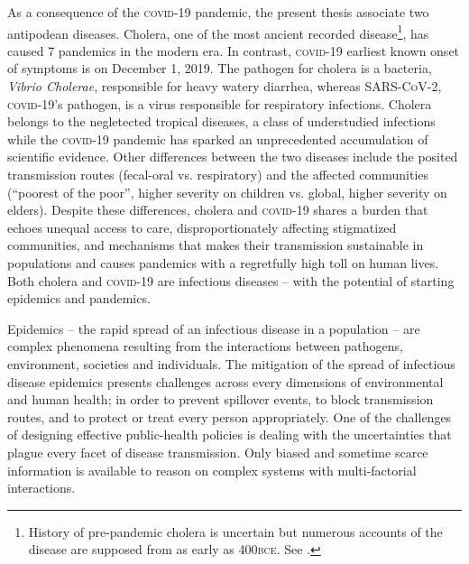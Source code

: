   As a consequence of the \textsc{covid}-19 pandemic, the present thesis associate two antipodean diseases. Cholera, one of the most ancient recorded disease\footnote[][]{History of pre-pandemic cholera is uncertain but numerous accounts of the disease are supposed from as early as 400\textsc{bce}. See .}, has caused 7 pandemics in the modern era. In contrast, \textsc{covid}-19 earliest known onset of symptoms is on December 1, 2019. The pathogen for cholera is a bacteria, \textit{Vibrio Cholerae}, responsible for heavy watery diarrhea, whereas \textsc{SARS-CoV-2}, \textsc{covid}-19’s pathogen, is a virus responsible for respiratory infections. Cholera belongs to the negletected tropical diseases, a class of understudied infections while the \textsc{covid}-19 pandemic has sparked an unprecedented accumulation of scientific evidence. 
Other differences between the two diseases include the posited transmission routes (fecal-oral vs. respiratory) and the affected communities (``poorest of the poor”, higher severity on children vs. global, higher severity on elders). Despite these differences, cholera and \textsc{covid}-19 shares a burden that echoes unequal access to care, disproportionately affecting stigmatized communities, and  mechanisms that makes their transmission sustainable in populations and causes pandemics with a regretfully high toll on human lives. Both cholera and \textsc{covid}-19 are infectious diseases -- with the potential of starting epidemics and pandemics.%

 
Epidemics -- the rapid spread of an infectious disease in a population -- are  complex phenomena resulting from the interactions between pathogens, environment, societies and individuals\cite{Rinaldo:RiverNetworksEcological:2020a, Buckee:ThinkingClearlySocial:2021, Heesterbeek:ModelingInfectiousDisease:2015}. The mitigation of the spread of infectious disease epidemics presents challenges across every dimensions of environmental and human health; in order to prevent spillover events, to block transmission routes, and to protect or treat every person appropriately. %
 One of the challenges of designing effective public-health policies is dealing with the uncertainties that plague every facet of disease transmission. Only biased and sometime scarce information is available to reason on complex systems with multi-factorial interactions. 
 
